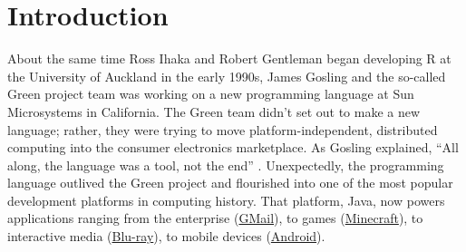 \hypertarget{introduction}{\section{Introduction}}


About the same time Ross Ihaka and Robert Gentleman began developing R at the University of Auckland in the early 1990s, James Gosling and the so-called Green project team was working on a new programming language at Sun Microsystems in California. The Green team didn't set out to make a new language; rather, they were trying to move platform-independent, distributed computing into the consumer electronics marketplace. As Gosling explained, ``All along, the language was a tool, not the end'' \citep{javainsidestory}. Unexpectedly, the programming language outlived the Green project and flourished into one of the most popular development platforms in computing history. That platform, Java, now powers applications ranging from the enterprise (\href{https://www.google.com/gmail/about/}{GMail}), to games (\href{https://minecraft.net}{Minecraft}), to interactive media (\href{https://en.wikipedia.org/wiki/Blu-ray}{Blu-ray}), to mobile devices (\href{https://www.android.com/}{Android}).

